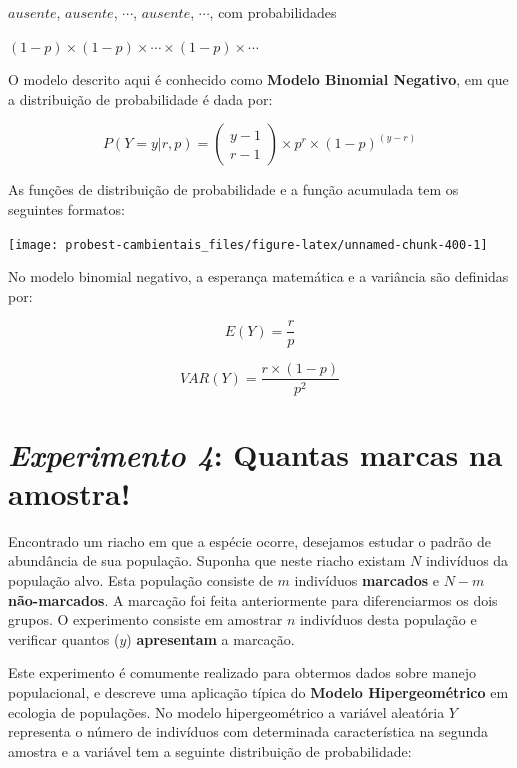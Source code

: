 \documentclass[
]{book}
\begin{document}
\(ausente\), \(ausente\), \(\cdots\), \(ausente\), \(\cdots\), com probabilidades

\((1-p) \times (1-p) \times \cdots \times (1-p) \times \cdots\)

O modelo descrito aqui é conhecido como \textbf{Modelo Binomial Negativo}, em que a distribuição de probabilidade é dada por:

\[P(Y = y|r,p) = \left (\begin{array}{c}
y - 1 \\
r - 1
\end{array}\right) \times p^{r} \times (1-p)^{(y-r)}\]

As funções de distribuição de probabilidade e a função acumulada tem os seguintes formatos:

\begin{center}\texttt{[image: probest-cambientais\_files/figure-latex/unnamed-chunk-400-1]} \end{center}

No modelo binomial negativo, a esperança matemática e a variância são definidas por:

\[E(Y) = \frac{r}{p}\]

\[VAR(Y) = \frac{r \times (1-p)}{p^2}\]

\hypertarget{experimento-4-quantas-marcas-na-amostra}{%
\section{\texorpdfstring{\emph{Experimento 4}: Quantas marcas na amostra!}{Experimento 4: Quantas marcas na amostra!}}\label{experimento-4-quantas-marcas-na-amostra}}

Encontrado um riacho em que a espécie ocorre, desejamos estudar o padrão de abundância de sua população. Suponha que neste riacho existam \(N\) indivíduos da população alvo. Esta população consiste de \(m\) indivíduos \textbf{marcados} e \(N-m\) \textbf{não-marcados}. A marcação foi feita anteriormente para diferenciarmos os dois grupos. O experimento consiste em amostrar \(n\) indivíduos desta população e verificar quantos (\(y\)) \textbf{apresentam} a marcação.

Este experimento é comumente realizado para obtermos dados sobre manejo populacional, e descreve uma aplicação típica do \textbf{Modelo Hipergeométrico} em ecologia de populações. No modelo hipergeométrico a variável aleatória \(Y\) representa o número de indivíduos com determinada característica na segunda amostra e a variável tem a seguinte distribuição de probabilidade:
\end{document}
